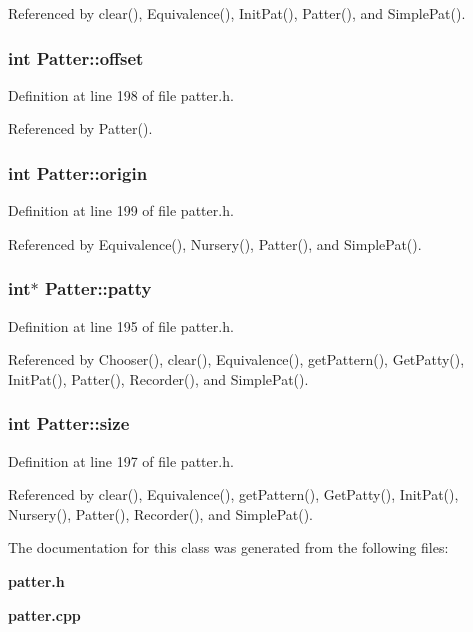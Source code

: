 Referenced by clear(), Equivalence(), Init\-Pat(), Patter(), and Simple\-Pat().
\subsubsection{\setlength{\rightskip}{0pt plus 5cm}int {\bf Patter::offset}\hspace{0.3cm}{\tt  [private]}}\label{classPatter_r3}




Definition at line 198 of file patter.h.

Referenced by Patter().
\subsubsection{\setlength{\rightskip}{0pt plus 5cm}int {\bf Patter::origin}\hspace{0.3cm}{\tt  [private]}}\label{classPatter_r4}




Definition at line 199 of file patter.h.

Referenced by Equivalence(), Nursery(), Patter(), and Simple\-Pat().
\subsubsection{\setlength{\rightskip}{0pt plus 5cm}int$\ast$ {\bf Patter::patty}\hspace{0.3cm}{\tt  [private]}}\label{classPatter_r1}




Definition at line 195 of file patter.h.

Referenced by Chooser(), clear(), Equivalence(), get\-Pattern(), Get\-Patty(), Init\-Pat(), Patter(), Recorder(), and Simple\-Pat().
\subsubsection{\setlength{\rightskip}{0pt plus 5cm}int {\bf Patter::size}\hspace{0.3cm}{\tt  [private]}}\label{classPatter_r2}




Definition at line 197 of file patter.h.

Referenced by clear(), Equivalence(), get\-Pattern(), Get\-Patty(), Init\-Pat(), Nursery(), Patter(), Recorder(), and Simple\-Pat().

The documentation for this class was generated from the following files:\begin{CompactItemize}
\item 
{\bf patter.h}\item 
{\bf patter.cpp}\end{CompactItemize}
